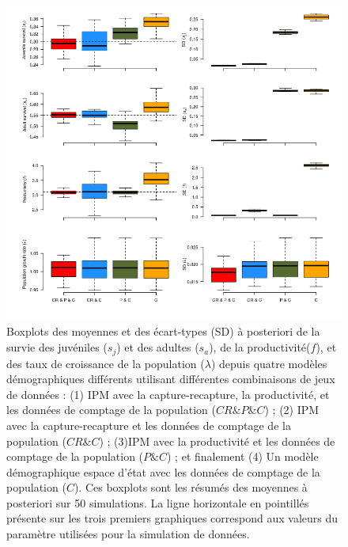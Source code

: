 \documentclass[12pt,a4paper]{article}
\begin{document}
\begin{figure}[!t]
\includegraphics[width=17cm]{50sim_Counts_28062022.png}
\caption{Boxplots des moyennes et des écart-types (SD) à posteriori de la survie des juvéniles ($s_j$) et des adultes ($s_a$), de la productivité($f$), et des taux de croissance de la population ($\lambda$) depuis quatre modèles démographiques différents utilisant différentes combinaisons de jeux de données : (1) IPM avec la capture-recapture, la productivité, et les données de comptage de la population ($CR \& P \& C$) ; (2) IPM avec la capture-recapture et les données de comptage de la population ($CR \& C$) ; (3)IPM avec la productivité et les données de comptage de la population ($P \& C$) ; et finalement (4) Un modèle démographique espace d'état avec les données de comptage de la population ($C$). Ces boxplots sont les résumés des moyennes à posteriori sur 50 simulations. La ligne horizontale en pointillés présente sur les trois premiers graphiques correspond aux valeurs du paramètre utilisées pour la simulation de données.}
\end{figure}
\end{document}

